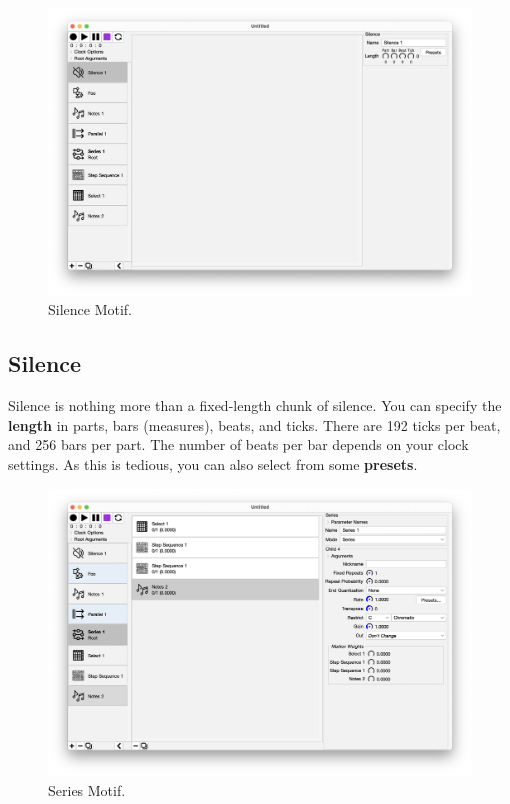 \documentclass[twoside,10pt]{article}
\begin{document}
\clearpage

\begin{figure}[t]
\centering
\includegraphics[width=6.5in]{Silence}
\vspace{-2em}
\caption{Silence Motif.}
\label{silence}
\end{figure}

\subsection{Silence}

Silence is nothing more than a fixed-length chunk of silence.    You can specify the {\bf length} in parts, bars (measures), beats, and ticks.  There are 192 ticks per beat, and 256 bars per part.  The number of beats per bar depends on your clock settings.  As this is tedious, you can also select from some {\bf presets}.


\begin{figure}[t]
\centering
\includegraphics[width=6.5in]{Series}
\vspace{-2em}
\caption{Series Motif.}
\label{series}
\end{figure}
\end{document}
